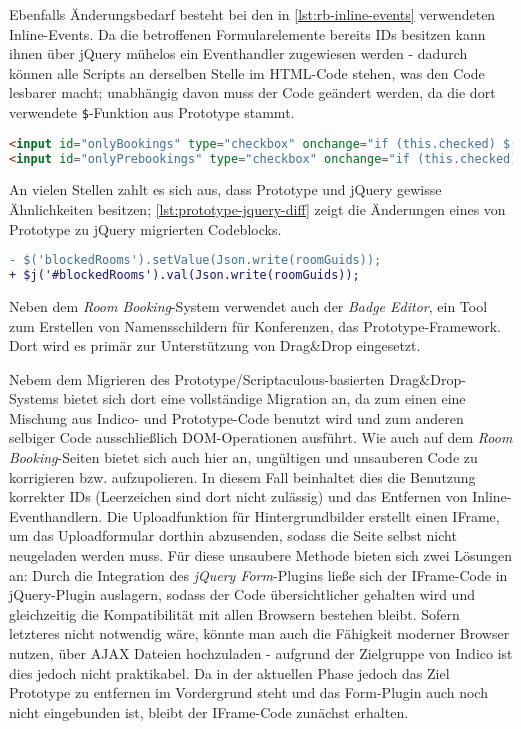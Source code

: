 Ebenfalls Änderungsbedarf besteht bei den in \autoref{lst:rb-inline-events} verwendeten
Inline-Events. Da die betroffenen Formularelemente bereits IDs besitzen kann ihnen über jQuery
mühelos ein Eventhandler zugewiesen werden - dadurch können alle Scripts an derselben Stelle im
HTML-Code stehen, was den Code lesbarer macht; unabhängig davon muss der Code geändert werden, da
die dort verwendete \lstinline{$}-Funktion aus Prototype stammt.

\begin{lstlisting}[language=HTML,label=lst:rb-inline-events,caption=Inline-Eventhandler]
<input id="onlyBookings" type="checkbox" onchange="if (this.checked) $('onlyPrebookings').checked = false;"/>
<input id="onlyPrebookings" type="checkbox" onchange="if (this.checked) $('onlyBookings').checked = false;" />
\end{lstlisting}

An vielen Stellen zahlt es sich aus, dass Prototype und jQuery gewisse Ähnlichkeiten besitzen;
\autoref{lst:prototype-jquery-diff} zeigt die Änderungen eines von Prototype zu jQuery migrierten
Codeblocks.

\begin{lstlisting}[language=diff,label=lst:prototype-jquery-diff,caption=Ähnlichkeit zwischen jQuery und Prototype]
- $('blockedRooms').setValue(Json.write(roomGuids));
+ $j('#blockedRooms').val(Json.write(roomGuids));
\end{lstlisting}

Neben dem \emph{Room Booking}-System verwendet auch der \emph{Badge Editor}, ein Tool zum Erstellen
von Namensschildern für Konferenzen, das Prototype-Framework. Dort wird es primär zur Unterstützung
von Drag\&Drop eingesetzt.


Nebem dem Migrieren des Prototype/Scriptaculous-basierten Drag\&Drop-Systems bietet sich dort eine
vollständige Migration an, da zum einen eine Mischung aus Indico- und Prototype-Code benutzt wird
und zum anderen selbiger Code ausschließlich DOM-Operationen ausführt. Wie auch auf dem \emph{Room
Booking}-Seiten bietet sich auch hier an, ungültigen und unsauberen Code zu korrigieren bzw.
aufzupolieren. In diesem Fall beinhaltet dies die Benutzung korrekter IDs (Leerzeichen sind dort
nicht zulässig) und das Entfernen von Inline-Eventhandlern. Die Uploadfunktion für
Hintergrundbilder erstellt einen IFrame, um das Uploadformular dorthin abzusenden, sodass die Seite
selbst nicht neugeladen werden muss. Für diese unsaubere Methode bieten sich zwei Lösungen an: Durch
die Integration des \emph{jQuery Form}-Plugins ließe sich der IFrame-Code in jQuery-Plugin
auslagern, sodass der Code übersichtlicher gehalten wird und gleichzeitig die Kompatibilität mit
allen Browsern bestehen bleibt. Sofern letzteres nicht notwendig wäre, könnte man auch die Fähigkeit
moderner Browser nutzen, über AJAX Dateien hochzuladen - aufgrund der Zielgruppe von Indico ist dies
jedoch nicht praktikabel. Da in der aktuellen Phase jedoch das Ziel Prototype zu entfernen im
Vordergrund steht und das Form-Plugin auch noch nicht eingebunden ist, bleibt der IFrame-Code
zunächst erhalten.

